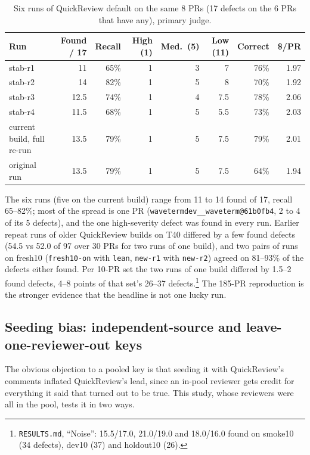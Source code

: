 \documentclass[11pt,a4paper]{article}
\newcommand{\qcr}{QuickReview}
\newcommand{\code}[1]{\texttt{#1}}
\begin{document}
\begin{table}[tbp]
  \centering
  \small
  \caption{Six runs of \qcr{} default on the same 8 PRs (17 defects on the
  6 PRs that have any), primary judge.}
  \label{tab:stab-sol}
  \begin{tabular}{lrrrrrrr}
    \toprule
    Run & Found / 17 & Recall & High (1) & Med.\ (5) & Low (11) & Correct & \$/PR \\
    \midrule
    stab-r1 & 11 & 65\% & 1 & 3 & 7 & 76\% & 1.97 \\
    stab-r2 & 14 & 82\% & 1 & 5 & 8 & 70\% & 1.92 \\
    stab-r3 & 12.5 & 74\% & 1 & 4 & 7.5 & 78\% & 2.06 \\
    stab-r4 & 11.5 & 68\% & 1 & 5 & 5.5 & 73\% & 2.03 \\
    current build, full re-run & 13.5 & 79\% & 1 & 5 & 7.5 & 79\% & 2.01 \\
    original run & 13.5 & 79\% & 1 & 5 & 7.5 & 64\% & 1.94 \\
    \bottomrule
  \end{tabular}
\end{table}

The six runs (five on the current build) range from 11 to 14 found of 17,
recall 65--82\%; most of the spread is one PR
(\code{wavetermdev\_\_waveterm@61b0fb4}, 2 to 4 of its 5 defects), and the one
high-severity defect was found in every run. Earlier repeat runs of older
\qcr{} builds on T40 differed by a few found defects (54.5 vs
52.0 of 97 over 30 PRs for two runs of one build), and two pairs of runs on
fresh10 (\code{fresh10-on} with \code{lean}, \code{new-r1} with
\code{new-r2}) agreed on 81--93\% of the defects either found. Per 10-PR set the
two runs of one build differed by 1.5--2 found defects, 4--8 points of that
set's 26--37 defects.\footnote{\code{RESULTS.md}, ``Noise'': 15.5/17.0,
21.0/19.0 and 18.0/16.0 found on smoke10 (34 defects), dev10 (37) and
holdout10 (26).} The
185-PR reproduction is the stronger evidence that the headline is not one
lucky run.

\subsection{Seeding bias: independent-source and leave-one-reviewer-out keys}
\label{sec:indep-sol}

The obvious objection to a pooled key is that seeding it with \qcr{}'s
comments inflated \qcr{}'s lead, since an in-pool reviewer gets credit for
everything it said that turned out to be true. This study, whose reviewers
were all in the pool, tests it in two ways.
\end{document}

